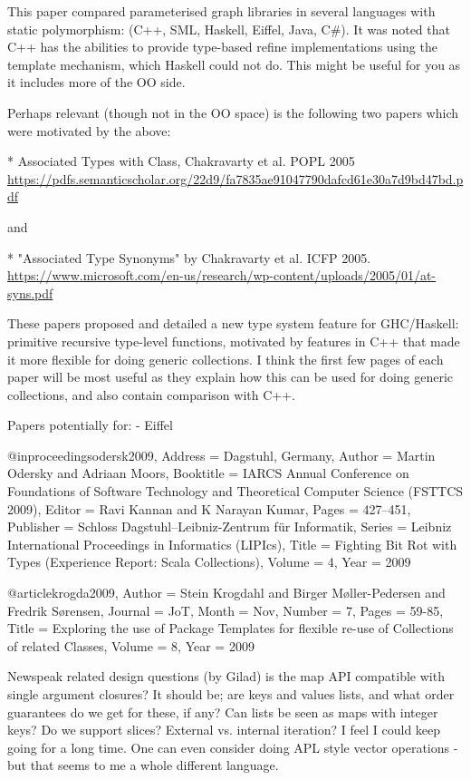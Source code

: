 \documentclass[sigconf, 10pt, review]{acmart}
\begin{document}
\begin{note}
This paper compared parameterised graph libraries in several languages with static polymorphism: (C++, SML, Haskell, Eiffel, Java, C\#). It was noted that C++ has the abilities to provide type-based refine implementations using the template mechanism, which Haskell could not do. This might be useful for you as it includes more of the OO side.

Perhaps relevant (though not in the OO space) is the following two papers which were motivated by the above:

* Associated Types with Class, Chakravarty et al. POPL 2005
\url{https://pdfs.semanticscholar.org/22d9/fa7835ae91047790dafcd61e30a7d9bd47bd.pdf}

and

* "Associated Type Synonyms" by Chakravarty et al. ICFP 2005.
\url{https://www.microsoft.com/en-us/research/wp-content/uploads/2005/01/at-syns.pdf}

These papers proposed and detailed a new type system feature for GHC/Haskell: primitive recursive type-level functions, motivated by features in C++ that made it more flexible for doing generic collections. I think the first few pages of each paper will be most useful as they explain how this can be used for doing generic collections, and also contain comparison with C++.

Papers potentially for:
 - Eiffel

@inproceedings{odersk2009,
	Address = {Dagstuhl, Germany},
	Author = {Martin Odersky and Adriaan Moors},
	Booktitle = {IARCS Annual Conference on Foundations of Software Technology and Theoretical Computer Science (FSTTCS 2009)},
	Editor = {Ravi Kannan and K Narayan Kumar},
	Pages = {427--451},
	Publisher = {Schloss Dagstuhl--Leibniz-Zentrum {f\"{u}r} Informatik},
	Series = {Leibniz International Proceedings in Informatics (LIPIcs)},
	Title = {Fighting Bit Rot with Types (Experience Report: Scala Collections)},
	Volume = {4},
	Year = {2009}}

@article{krogda2009,
	Author = {Stein Krogdahl and Birger M{\o}ller-Pedersen and Fredrik S{\o}rensen},
	Journal = {JoT},
	Month = {Nov},
	Number = {7},
	Pages = {59-85},
	Title = {Exploring the use of Package Templates for flexible re-use of Collections of related Classes},
	Volume = {8},
	Year = {2009}}
  
  
Newspeak related design questions (by Gilad)
is the map API compatible with single argument closures? It should be; are keys and values lists, and what order guarantees do we get for these, if any? Can lists be seen as maps with integer keys? Do we support slices? External vs. internal iteration? I feel I could keep going for a long time. One can even consider doing APL style vector operations - but that seems to me a whole different language.



\end{note}
\end{document}
